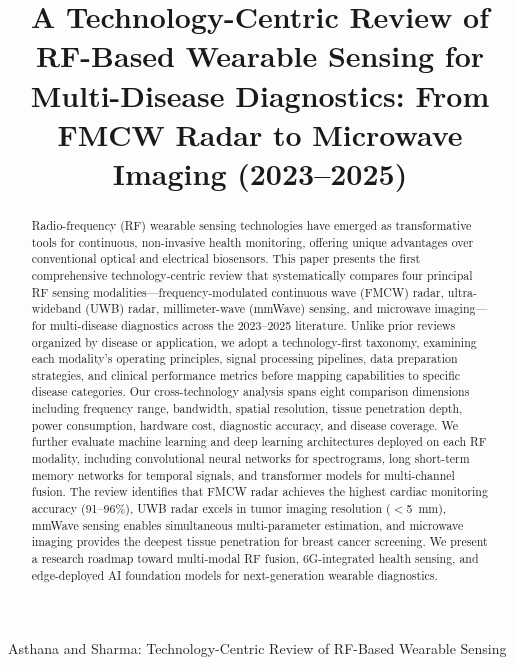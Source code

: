 \documentclass[journal,twoside]{IEEEtran}
\begin{document}
\title{A Technology-Centric Review of RF-Based Wearable Sensing for Multi-Disease Diagnostics: From FMCW Radar to Microwave Imaging (2023--2025)}

\author{
}

%
{Asthana and Sharma: Technology-Centric Review of RF-Based Wearable Sensing}

\maketitle

\begin{abstract}
Radio-frequency (RF) wearable sensing technologies have emerged as transformative tools for continuous, non-invasive health monitoring, offering unique advantages over conventional optical and electrical biosensors. This paper presents the first comprehensive technology-centric review that systematically compares four principal RF sensing modalities---frequency-modulated continuous wave (FMCW) radar, ultra-wideband (UWB) radar, millimeter-wave (mmWave) sensing, and microwave imaging---for multi-disease diagnostics across the 2023--2025 literature. Unlike prior reviews organized by disease or application, we adopt a technology-first taxonomy, examining each modality's operating principles, signal processing pipelines, data preparation strategies, and clinical performance metrics before mapping capabilities to specific disease categories. Our cross-technology analysis spans eight comparison dimensions including frequency range, bandwidth, spatial resolution, tissue penetration depth, power consumption, hardware cost, diagnostic accuracy, and disease coverage. We further evaluate machine learning and deep learning architectures deployed on each RF modality, including convolutional neural networks for spectrograms, long short-term memory networks for temporal signals, and transformer models for multi-channel fusion. The review identifies that FMCW radar achieves the highest cardiac monitoring accuracy (91--96\%), UWB radar excels in tumor imaging resolution ($<$5~mm), mmWave sensing enables simultaneous multi-parameter estimation, and microwave imaging provides the deepest tissue penetration for breast cancer screening. We present a research roadmap toward multi-modal RF fusion, 6G-integrated health sensing, and edge-deployed AI foundation models for next-generation wearable diagnostics.
\end{abstract}
\end{document}
